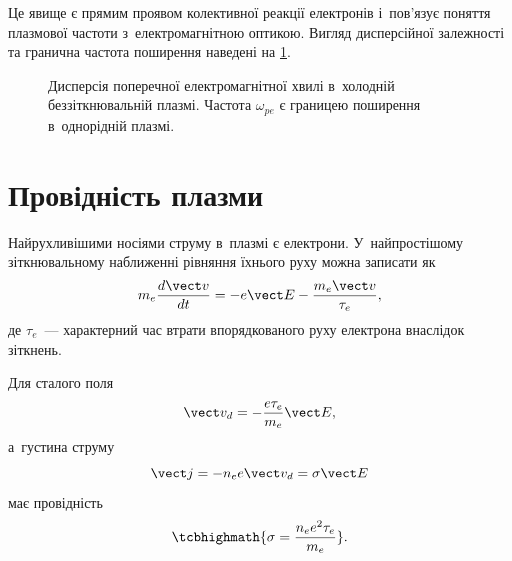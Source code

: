 Це явище є прямим проявом колективної реакції електронів і~пов'язує поняття плазмової частоти з~електромагнітною оптикою. Вигляд дисперсійної залежності та гранична частота поширення наведені на \ref{fig:plasma-dispersion}.

\begin{figure}[htbp]\centering
	\caption{Дисперсія поперечної електромагнітної хвилі в~холодній беззіткнювальній плазмі. Частота $\omega_{pe}$ є границею поширення в~однорідній плазмі.}\label{fig:plasma-dispersion}
\end{figure}

\section{Провідність плазми}\label{sec:plasma-conductivity}

Найрухливішими носіями струму в~плазмі є електрони. У~найпростішому зіткнювальному наближенні рівняння їхнього руху можна записати як
\begin{equation}
	m_e\frac{d\vect v}{dt}
	=-e\vect E-\frac{m_e\vect v}{\tau_e},
\end{equation}
де $\tau_e$~--- характерний час втрати впорядкованого руху електрона внаслідок зіткнень.

Для сталого поля
\begin{equation*}
	\vect v_d=-\frac{e\tau_e}{m_e}\vect E,
\end{equation*}
а~густина струму
\begin{equation}
	\vect j=-n_e e\vect v_d
	=\sigma\vect E
\end{equation}
має провідність
\begin{equation}
	\tcbhighmath{\sigma=\frac{n_e e^2\tau_e}{m_e}}.
\end{equation}

